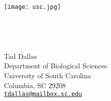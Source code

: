 \documentclass[12pt]{article}
\newcommand{\email}[1]{\href{mailto:#1}{\tt \textcolor{cornflower}{#1}}}
\begin{document}
\begin{minipage}[c]{8in}\vskip-2cm
\begin{flushleft}
	\begin{minipage}[c]{6cm}
		\begin{flushleft}
			\texttt{[image: usc.jpg]}%
		\end{flushleft}
	\end{minipage}
	\,\,
	\begin{minipage}[c]{0.25cm}
		\vrule depth 0.1\textheight
	\end{minipage}
	\,
	\begin{minipage}[c]{8cm}
		\footnotesize
		{\sffamily
			Tad Dallas \\
			Department of Biological Sciences \\
			University of South Carolina\\
			Columbia, SC 29208 \\
			\email{tdallas@mailbox.sc.edu}
		}
	\end{minipage}
\end{flushleft}
\end{minipage}
\end{document}
